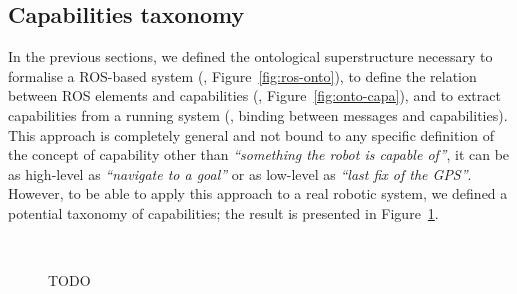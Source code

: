 \subsection{Capabilities taxonomy}
In the previous sections, we defined the ontological superstructure necessary to formalise a ROS-based system (\ie, Figure~\ref{fig:ros-onto}), to define the relation between ROS elements and capabilities (\ie, Figure~\ref{fig:onto-capa}), and to extract capabilities from a running system (\ie, binding between messages and capabilities). This approach is completely general and not bound to any specific definition of the concept of capability other than \textit{``something the robot is capable of''}, it can be as high-level as \textit{``navigate to a goal''} or as low-level as \textit{``last fix of the GPS''}. However, to be able to apply this approach to a real robotic system, we defined a potential taxonomy of capabilities; the result is presented in Figure~\ref{fig:taxo}.

\begin{figure}[t]
    \myfloatalign
     \\
    \caption[TODO]{TODO}\label{fig:taxo}
\end{figure}

